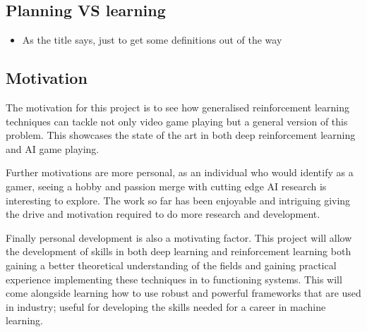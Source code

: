 \documentclass[a4paper]{article}
\begin{document}
\subsection{Planning VS learning}
\begin{itemize}
    \item As the title says, just to get some definitions out of the way
\end{itemize}

\subsection{Motivation}
The motivation for this project is to see how generalised reinforcement learning techniques can tackle not only video game playing but a general version of this problem.
This showcases the state of the art in both deep reinforcement learning and AI game playing.
\par
Further motivations are more personal, as an individual who would identify as a gamer, seeing a hobby and passion merge with cutting edge AI research is interesting to explore.
The work so far has been enjoyable and intriguing giving the drive and motivation required to do more research and development.
\par
Finally personal development is also a motivating factor.
This project will allow the development of skills in both deep learning and reinforcement learning both gaining a better theoretical understanding of the fields and gaining practical experience implementing these techniques in to functioning systems.
This will come alongside learning how to use robust and powerful frameworks that are used in industry; useful for developing the skills needed for a career in machine learning.
\end{document}
